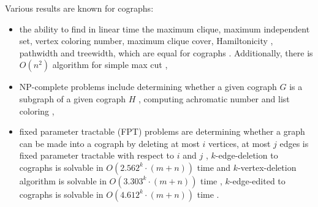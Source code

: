 Various results are known for cographs:
\begin{itemize}
    \item the ability to find in linear time the maximum clique, maximum independent set, vertex coloring number, maximum clique cover,  Hamiltonicity \cite{corneil_lerchs_stewart_81},  pathwidth and treewidth, which are equal for cographs \cite{Bodlaender1990ThePA}. Additionally, there is $O (n^2) $ algorithm for simple max cut \cite{Bodlaender1994OnTC},
    \item NP-complete problems include determining whether a given cograph $G$ is a subgraph of a given cograph $H$ \cite{damaschke_91}, computing achromatic number \cite{Bodlaender1989AchromaticNI} and list coloring \cite{Jansen1992GeneralizedCF},
    \item fixed parameter tractable (FPT)  problems are determining whether a graph can be made into a cograph by deleting at most $i$ vertices, at most $j$ edges is fixed parameter tractable with respect to $i$ and $j$ \cite{Cai1996FixedParameterTO}, $k$-edge-deletion to cographs is solvable in $O(2.562^k \cdot (m + n))$ time and $k$-vertex-deletion algorithm is solvable in $O(3.303^k \cdot (m +n))$ time \cite{nastos_gao_10}, $k$-edge-edited to cographs is solvable in $O(4.612^k \cdot (m+n))$ time \cite{Liu2012ComplexityAP}.
\end{itemize}
